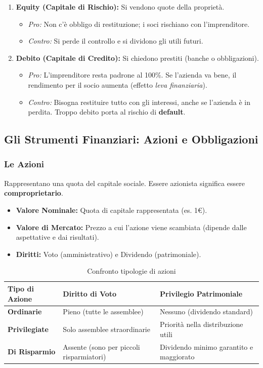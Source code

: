 \documentclass[a4paper,12pt]{article}
\begin{document}
	\begin{enumerate}
		\item \textbf{Equity (Capitale di Rischio):} Si vendono quote della proprietà. 
		\begin{itemize}
			\item \textit{Pro:} Non c'è obbligo di restituzione; i soci rischiano con l'imprenditore.
			\item \textit{Contro:} Si perde il controllo e si dividono gli utili futuri.
		\end{itemize}
		\item \textbf{Debito (Capitale di Credito):} Si chiedono prestiti (banche o obbligazioni).
		\begin{itemize}
			\item \textit{Pro:} L'imprenditore resta padrone al 100\%. Se l'azienda va bene, il rendimento per il socio aumenta (effetto \textit{leva finanziaria}).
			\item \textit{Contro:} Bisogna restituire tutto con gli interessi, anche se l'azienda è in perdita. Troppo debito porta al rischio di \textbf{default}.
		\end{itemize}
	\end{enumerate}
	
	\subsection{Gli Strumenti Finanziari: Azioni e Obbligazioni}
	
	\subsubsection{Le Azioni}
	Rappresentano una quota del capitale sociale. Essere azionista significa essere \textbf{comproprietario}.
	\begin{itemize}
		\item \textbf{Valore Nominale:} Quota di capitale rappresentata (es. 1€).
		\item \textbf{Valore di Mercato:} Prezzo a cui l'azione viene scambiata (dipende dalle aspettative e dai risultati).
		\item \textbf{Diritti:} Voto (amministrativo) e Dividendo (patrimoniale).
	\end{itemize}
	
	\begin{table}[h!]
		\centering
		\small
		\renewcommand{\arraystretch}{1.5}
		\begin{tabular}{|p{3cm}|p{4cm}|p{4cm}|}
			\hline
			\rowcolor{gray!20} \textbf{Tipo di Azione} & \textbf{Diritto di Voto} & \textbf{Privilegio Patrimoniale} \\ \hline
			\textbf{Ordinarie} & Pieno (tutte le assemblee) & Nessuno (dividendo standard) \\ \hline
			\textbf{Privilegiate} & Solo assemblee straordinarie & Priorità nella distribuzione utili \\ \hline
			\textbf{Di Risparmio} & Assente (sono per piccoli risparmiatori) & Dividendo minimo garantito e maggiorato \\ \hline
		\end{tabular}
		\caption{Confronto tipologie di azioni}
	\end{table}
	
\end{document}
